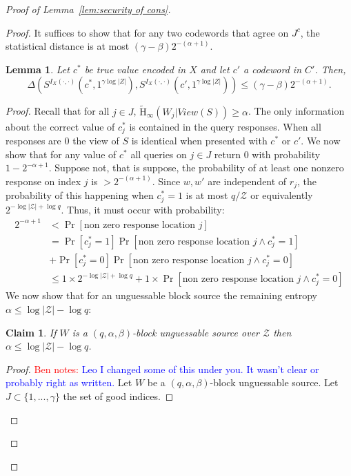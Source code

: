 \documentclass[11pt]{article}
\newcommand{\lemref}[1]{\mbox{Lemma~\ref{#1}}}
\newcommand{\Hav}{\tilde{\mathrm{H}}_\infty}
\newtheorem{lemma}[theorem]{Lemma}
\newtheorem{claim}[theorem]{Claim}
\newcommand{\authnote}[2]{{\textcolor{red}{\textsf{#1 notes: }\textcolor{blue}{ #2}}\marginpar{\textcolor{red}{\textbf{!!!!!}}}}}
\newcommand{\authnote}[2]{}
\newcommand{\bnote}[1]{{\authnote{Ben}{#1}}}
\begin{document}
\begin{proof}[Proof of \lemref{lem:security of cons}]
\begin{proof}
\noindent It suffices to show that for any two codewords that agree on $J^c$, the statistical distance is at most $(\gamma-\beta)2^{-(\alpha+1)}$.
\begin{lemma}
\label{lem:codewords in I close}
Let $c^*$ be true value encoded in $X$ and let $c'$ a codeword in $C'$.  Then,
\[
\Delta( S^{I_X(\cdot, \cdot)}(c^*, 1^{\gamma \log |Z|}), S^{I_X(\cdot, \cdot)}(c', 1^{\gamma \log |Z|})) \le ( \gamma -\beta) 2^{-(\alpha+1)}.
\]
\end{lemma}
\begin{proof}
Recall that for all $j\in J$, $\Hav(W_j | View(S))\geq \alpha$.  The only information about the correct value of $c_j^*$ is contained in the query responses.  When all responses are $0$ the view of $S$ is identical when presented with $c^*$ or $c'$.  We now show that for any value of $c^*$ all queries on $j \in J$ return $0$ with probability $1-2^{-\alpha+1}$.  Suppose not, that is suppose, the probability of at least one nonzero response on index $j$ is $> 2^{-(\alpha+1)}$.  Since $w, w'$ are independent of $r_j$, the probability of this happening when $c^*_j = 1$ is at most $q/\mathcal{Z}$ or  equivalently $2^{-\log |\mathcal{Z}|+\log q}$.  Thus, it must occur with probability:
\begin{align}
2^{-\alpha+1}&<\Pr[\text{non zero response location }j]\nonumber \\
 &= \Pr[c_j^* =1]\Pr[\text{non zero response location }j\wedge c_j^*=1]\nonumber \\&+ \Pr[c_j^*=0] \Pr[\text{non zero response location }j \wedge c_j^*=0]\nonumber \\
&\le 1\times 2^{-\log|\mathcal{Z}|+\log q} + 1\times  \Pr[\text{non zero response location }j \wedge c_j^*=0] \label{eq:ways to remove ent}
\end{align}
We now show that for an unguessable block source the remaining entropy $\alpha\leq \log |\mathcal{Z}|-\log q $:
\begin{claim}
\label{cl:ent bounded away from n}
If $W$ is a $(q, \alpha, \beta)$-block unguessable source over $\mathcal{Z}$ then $\alpha \le \log |\mathcal{Z}|-\log q$.
\end{claim}
\begin{proof}
\bnote{Leo I changed some of this under you.  It wasn't clear or probably right as written.}
Let $W$ be a $(q, \alpha, \beta)$-block unguessable source.  Let $J\subset\{1,..., \gamma\}$ the set of good indices.

\end{proof}
\end{proof}
\end{proof}
\end{proof}
\end{document}

